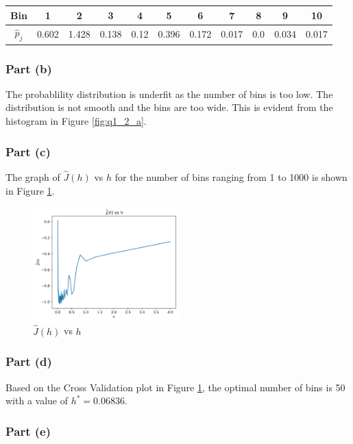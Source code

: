 \begin{tabular}
    { |c|c|c|c|c|c|c|c|c|c|c| }
    \hline
    Bin & 1 & 2 & 3 & 4 & 5 & 6 & 7 & 8 & 9 & 10 \\
    \hline
    $\hat{p}_j$ & 0.602 & 1.428 & 0.138 & 0.12 & 0.396 & 0.172 & 0.017 & 0.0 & 0.034 & 0.017 \\
    \hline
\end{tabular}

\subsubsection{Part (b)}

The probablility distribution is underfit as the number of bins is too low. The distribution is not smooth and the bins are too wide. This is evident from the histogram in Figure \ref{fig:q1_2_a}.

\subsubsection{Part (c)}

The graph of $\hat{J}(h)$ vs $h$ for the number of bins ranging from 1 to 1000 is shown in Figure \ref{fig:q1_2_c}.

\begin{figure}[H]
    \centering
    \includegraphics[width=0.5\textwidth]{../q1/images/crossvalidation.png}
    \caption{$\hat{J}(h)$ vs $h$}
    \label{fig:q1_2_c}
\end{figure}

\subsubsection{Part (d)}

Based on the Cross Validation plot in Figure \ref{fig:q1_2_c}, the optimal number of bins is 50 with a value of $h^\ast = 0.06836$.

\subsubsection{Part (e)}

